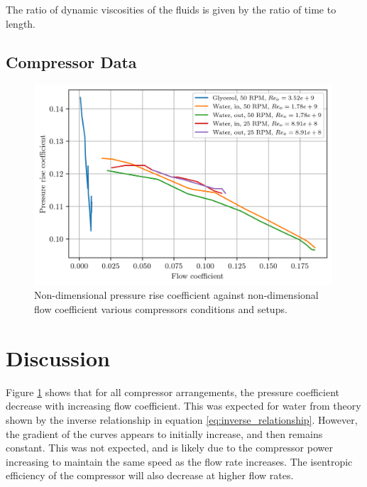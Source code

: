 \documentclass{article}
\begin{document}
The ratio of dynamic viscosities of the fluids is given by the ratio of time to length.

\subsection{Compressor Data}

\begin{figure}[H]
    \centering
    \includegraphics[width=0.99\textwidth]{compressor_non_dims.png}
    \caption{Non-dimensional pressure rise coefficient against non-dimensional flow coefficient various compressors conditions and setups.}
    \label{fig:compressor_non_dims}
\end{figure}


\section{Discussion}

Figure \ref{fig:compressor_non_dims} shows that for all compressor arrangements, the pressure coefficient decrease with increasing flow coefficient.
This was expected for water from theory shown by the inverse relationship in equation \ref{eq:inverse_relationship}.
However, the gradient of the curves appears to initially increase, and then remains constant.
This was not expected, and is likely due to the compressor power increasing to maintain the same speed as the flow rate increases.
The isentropic efficiency of the compressor will also decrease at higher flow rates.
\end{document}
